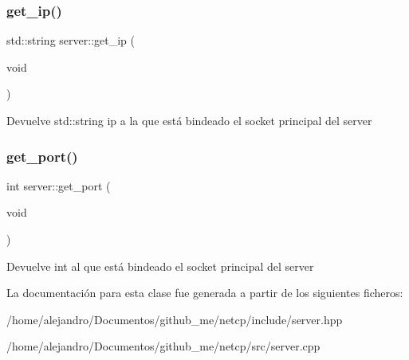 \subsubsection{\texorpdfstring{get\+\_\+ip()}{get\_ip()}}
{\footnotesize\ttfamily std\+::string server\+::get\+\_\+ip (\begin{DoxyParamCaption}\item[{void}]{ }\end{DoxyParamCaption})}

\begin{DoxyReturn}{Devuelve}
std\+::string ip a la que está bindeado el socket principal del server 
\end{DoxyReturn}
\mbox{\label{classserver_a85c34ce8e949d74f068025b11bd04bcc}} 
\subsubsection{\texorpdfstring{get\+\_\+port()}{get\_port()}}
{\footnotesize\ttfamily int server\+::get\+\_\+port (\begin{DoxyParamCaption}\item[{void}]{ }\end{DoxyParamCaption})}

\begin{DoxyReturn}{Devuelve}
int al que está bindeado el socket principal del server 
\end{DoxyReturn}


La documentación para esta clase fue generada a partir de los siguientes ficheros\+:\begin{DoxyCompactItemize}
\item 
/home/alejandro/\+Documentos/github\+\_\+me/netcp/include/server.\+hpp\item 
/home/alejandro/\+Documentos/github\+\_\+me/netcp/src/server.\+cpp\end{DoxyCompactItemize}
